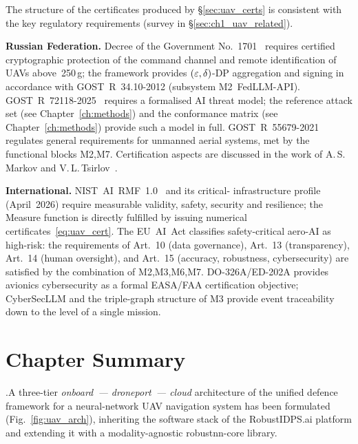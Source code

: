 The structure of the certificates produced by \S\ref{sec:uav_certs}
is consistent with the key regulatory requirements
(survey in \S\ref{sec:ch1_uav_related}).

\noindent\textbf{Russian Federation.}
Decree of the Government No.~1701~\cite{decree_1701} requires
certified cryptographic protection of the command channel and remote
identification of UAVs above~250\,g; the framework provides
$(\varepsilon,\delta)$-DP aggregation and signing in accordance with
\mbox{GOST~R~34.10-2012} (subsystem \textsf{M2~FedLLM-API}).
\mbox{GOST~R~72118-2025}~\cite{GOST_R_72118_2025} requires a
formalised AI threat model; the reference attack set
(see Chapter~\ref{ch:methods}) and the conformance matrix
(see Chapter~\ref{ch:methods}) provide such a model in full.
\mbox{GOST~R~55679-2021}~\cite{GOST_R_55679_2021} regulates general
requirements for unmanned aerial systems, met by the functional
blocks \textsf{M2,M7}. Certification aspects are discussed in the
work of A.\,S.\,Markov and V.\,L.\,Tsirlov~\cite{Markov2023certify}.

\noindent\textbf{International.}
\mbox{NIST~AI~RMF~1.0}~\cite{nist_rmf_2023} and its critical-
infrastructure profile (April~2026) require measurable validity,
safety, security and resilience; the \textsf{Measure} function is
directly fulfilled by issuing numerical
certificates~\eqref{eq:uav_cert}. The \mbox{EU~AI~Act} classifies
safety-critical aero-AI as high-risk: the requirements of Art.~10
(data governance), Art.~13 (transparency), Art.~14 (human oversight),
and Art.~15 (accuracy, robustness, cybersecurity) are satisfied by
the combination of \textsf{M2,M3,M6,M7}. \mbox{DO-326A/ED-202A}
\cite{do_326a_2024} provides avionics cybersecurity as a formal
EASA/FAA certification objective; \textsf{CyberSecLLM} and the
triple-graph structure of \textsf{M3} provide event traceability
down to the level of a single mission.


\section{Chapter Summary}
\label{sec:uav_summary}

.\quad A three-tier \emph{onboard~--- droneport~--- cloud}
architecture of the unified defence framework for a neural-network
UAV navigation system has been formulated (Fig.~\ref{fig:uav_arch}),
inheriting the software stack of the \textsf{RobustIDPS.ai} platform
and extending it with a modality-agnostic \textsf{robustnn-core}
library.

